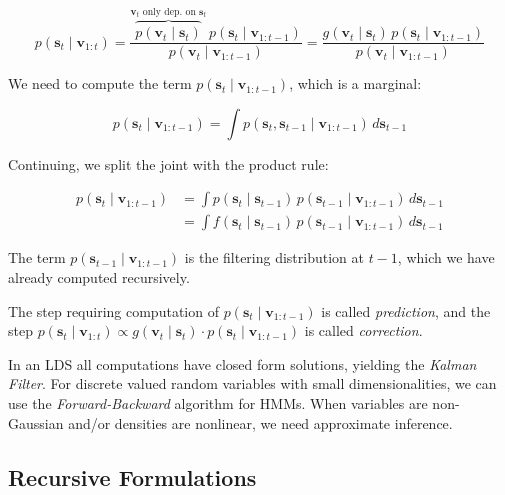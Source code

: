 \documentclass[11pt,a4paper]{article}
\begin{document}
\begin{equation}
\label{eq:bayes_filter}
p(\mathbf{s}_t \mid \mathbf{v}_{1:t}) = \frac{\overbrace{p(\mathbf{v}_t \mid \mathbf{s}_t)}^{\mathbf{v}_t \text{ only dep. on } \mathbf{s}_t} \, p(\mathbf{s}_t \mid \mathbf{v}_{1:t-1})}{p(\mathbf{v}_t \mid \mathbf{v}_{1:t-1})} = \frac{g(\mathbf{v}_t \mid \mathbf{s}_t) \, p(\mathbf{s}_t \mid \mathbf{v}_{1:t-1})}{p(\mathbf{v}_t \mid \mathbf{v}_{1:t-1})}
\end{equation}

We need to compute the term $p(\mathbf{s}_t \mid \mathbf{v}_{1:t-1})$, which is a marginal:

\begin{equation}
p(\mathbf{s}_t \mid \mathbf{v}_{1:t-1}) = \int p(\mathbf{s}_t, \mathbf{s}_{t-1} \mid \mathbf{v}_{1:t-1}) \, d\mathbf{s}_{t-1}
\end{equation}

Continuing, we split the joint with the product rule:

\begin{align}
p(\mathbf{s}_t \mid \mathbf{v}_{1:t-1}) &= \int p(\mathbf{s}_t \mid \mathbf{s}_{t-1}) \, p(\mathbf{s}_{t-1} \mid \mathbf{v}_{1:t-1}) \, d\mathbf{s}_{t-1} \nonumber \\
&= \int f(\mathbf{s}_t \mid \mathbf{s}_{t-1}) \, p(\mathbf{s}_{t-1} \mid \mathbf{v}_{1:t-1}) \, d\mathbf{s}_{t-1}
\label{eq:prediction}
\end{align}

The term $p(\mathbf{s}_{t-1} \mid \mathbf{v}_{1:t-1})$ is the filtering distribution at $t-1$, which we have already computed recursively.

The step requiring computation of $p(\mathbf{s}_t \mid \mathbf{v}_{1:t-1})$ is called \textit{prediction}, and the step $p(\mathbf{s}_t \mid \mathbf{v}_{1:t}) \propto g(\mathbf{v}_t \mid \mathbf{s}_t) \cdot p(\mathbf{s}_t \mid \mathbf{v}_{1:t-1})$ is called \textit{correction}.

In an LDS all computations have closed form solutions, yielding the \textit{Kalman Filter}. For discrete valued random variables with small dimensionalities, we can use the \textit{Forward-Backward} algorithm for HMMs. When variables are non-Gaussian and/or densities are nonlinear, we need approximate inference.

\subsection{Recursive Formulations}
\end{document}
